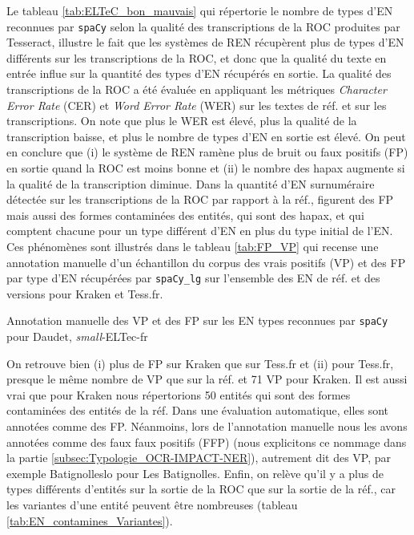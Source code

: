 Le tableau \ref{tab:ELTeC_bon_mauvais} qui répertorie le nombre de types d'EN reconnues par \texttt{spaCy} selon la qualité des transcriptions de la ROC produites par Tesseract, illustre le fait que les systèmes de REN récupèrent plus de types d'EN différents sur les transcriptions de la ROC, et donc que la qualité du texte en entrée influe sur la quantité des types d'EN récupérés en sortie. La qualité des transcriptions de la ROC a été évaluée en appliquant les métriques \textit{Character Error Rate} (CER) et \textit{Word Error Rate} (WER) sur les textes de réf. et sur les transcriptions. On note que plus le WER est élevé, plus la qualité de la transcription baisse, et plus le nombre de types d'EN en sortie est élevé. On peut en conclure que (i) le système de REN ramène plus de bruit ou faux positifs (FP) en sortie quand la ROC est moins bonne et (ii) le nombre des hapax augmente si la qualité de la transcription diminue. 
Dans la quantité d'EN surnuméraire détectée sur les transcriptions de la ROC par rapport à la réf., figurent des FP mais aussi des formes contaminées des entités, qui sont des hapax, et qui comptent chacune pour un type différent d'EN en plus du type initial de l'EN. Ces phénomènes sont illustrés dans le tableau \ref{tab:FP_VP} qui recense une annotation manuelle d'un échantillon du corpus
des vrais positifs (VP) et des FP par type d'EN récupérées par \texttt{spaCy\_lg} sur l'ensemble des EN de réf. et des versions pour Kraken et Tess.fr. 
\begin{table}[h!]
\small
    \centering
    
    \caption{Annotation manuelle des VP et des FP sur les EN types reconnues par \texttt{spaCy} pour Daudet, \textit{small}-ELTec-fr}
    \label{tab:FP_VP}
\end{table}

On retrouve bien (i) plus de FP sur Kraken que sur Tess.fr et (ii) pour Tess.fr, presque le même nombre de VP que sur la réf. et 71 VP pour Kraken. Il est aussi vrai que pour Kraken nous répertorions 50 entités qui sont des formes contaminées des entités de la réf. Dans une évaluation automatique, elles sont annotées comme des FP. Néanmoins, lors de l'annotation manuelle nous les avons annotées comme des faux faux positifs (FFP) (nous explicitons ce nommage dans la partie \ref{subsec:Typologie_OCR-IMPACT-NER}), autrement dit des VP, par exemple \og{}Batignolleslo\fg{} pour \og{}Les Batignolles\fg{}. Enfin, on relève qu'il y a plus de types différents d'entités sur la sortie de la ROC que sur la sortie de la réf., car les variantes d'une entité peuvent être nombreuses (tableau \ref{tab:EN_contamines_Variantes}). 

